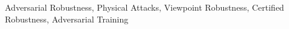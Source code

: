 \documentclass[10pt,journal,compsoc]{IEEEtran}
\begin{document}
{%
\begin{IEEEkeywords}
Adversarial Robustness, Physical Attacks, Viewpoint Robustness, Certified Robustness, Adversarial Training
\end{IEEEkeywords}}


\maketitle


\IEEEdisplaynontitleabstractindextext



%
\IEEEpeerreviewmaketitle



\end{document}
